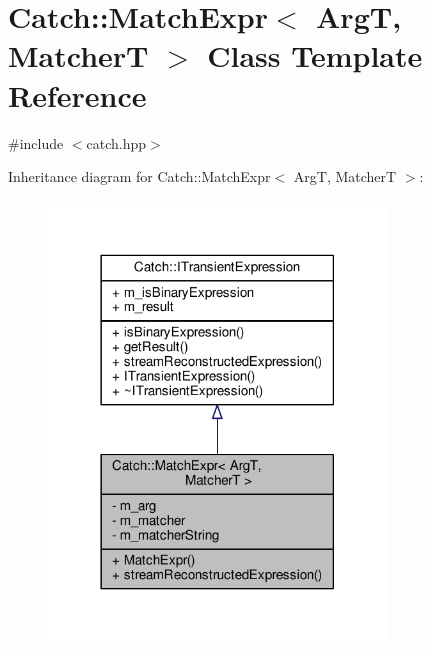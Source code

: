 \hypertarget{class_catch_1_1_match_expr}{\section{Catch\-:\-:Match\-Expr$<$ Arg\-T, Matcher\-T $>$ Class Template Reference}
\label{class_catch_1_1_match_expr}
}


{\ttfamily \#include $<$catch.\-hpp$>$}



Inheritance diagram for Catch\-:\-:Match\-Expr$<$ Arg\-T, Matcher\-T $>$\-:
\nopagebreak
\begin{figure}[H]
\begin{center}
\leavevmode
\includegraphics[width=254pt]{class_catch_1_1_match_expr__inherit__graph}
\end{center}
\end{figure}


